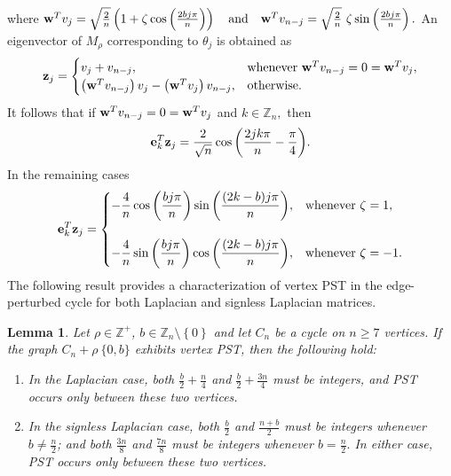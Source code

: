 \documentclass[12pt,a4paper]{article}
\newtheorem{lem}{Lemma}
\def \e {{\mathbf e}}
\def \z {{\bf z}}
\def \w {{\bf w}}
\newcommand{\ob}[1]{\left(#1\right)}
\newcommand{\cb}[1]{\left\lbrace #1\right\rbrace}
\begin{document}
where $\w^Tv_j=\sqrt{\frac{2}{n}}\ob{1+\zeta\cos\ob{\frac{2bj\pi}{n}}} \quad \text{and} \quad \w^Tv_{n-j}=\sqrt{\frac{2}{n}}~\zeta \sin \ob{\frac{2bj\pi}{n}}.$ An eigenvector of $M_{\rho}$ corresponding to $\theta_j$ is obtained as
\[\z_j=\begin{cases}
v_j+v_{n-j},& \text{whenever }\w^Tv_{n-j}= 0 =\w^Tv_j,\\
\ob{\w^Tv_{n-j}}v_j- \ob{\w^Tv_j}v_{n-j},& \text{otherwise.}
\end{cases}
\]
It follows that if $\w^Tv_{n-j}= 0 =\w^Tv_j$ and $k \in \mathbb{Z}_n,$ then
\begin{equation}\label{E5}
  \e_k^T \z_j= \dfrac{2}{\sqrt{n}} \cos{\left( \dfrac{2jk\pi}{n}-\dfrac{\pi}{4} \right)}. 
\end{equation}
In the remaining cases
\begin{equation}\label{E6}
\e_k^T\z_j=\begin{cases}
-\dfrac{4}{n} \cos{\left( \dfrac{bj\pi}{n} \right)} \sin{\left( \dfrac{(2k - b)j\pi}{n} \right)}, & \text{whenever } \zeta = 1, \\
\\
-\dfrac{4}{n} \sin{\left( \dfrac{bj\pi}{n} \right)} \cos{\left( \dfrac{(2k - b)j\pi}{n} \right)}, & \text{whenever } \zeta = -1.
\end{cases}
\end{equation}
 The following result provides a characterization of vertex PST in the edge-perturbed cycle for both Laplacian and signless Laplacian matrices.
\begin{lem}\label{L4}
Let $\rho \in \mathbb{Z}^+$, $b \in \mathbb{Z}_n\setminus \cb{0}$ and let $C_n$ be a cycle on $n \geq 7$ vertices. If the graph $C_n + \rho ~\{0, b\}$ exhibits vertex PST, then the following hold: 
\begin{enumerate}
  
  \item In the Laplacian case, both $\frac{b}{2} + \frac{n}{4}$ and $\frac{b}{2} + \frac{3n}{4}$ must be integers, and PST occurs only between these two vertices.

   \item In the signless Laplacian case, both $\frac{b}{2}$ and $\frac{n + b}{2}$ must be integers whenever $b \neq \frac{n}{2}$; and both $\frac{3n}{8}$ and $\frac{7n}{8}$ must be integers whenever $b = \frac{n}{2}.$ In either case, PST occurs only between these two vertices.
   
\end{enumerate}
\end{lem}
\end{document}
